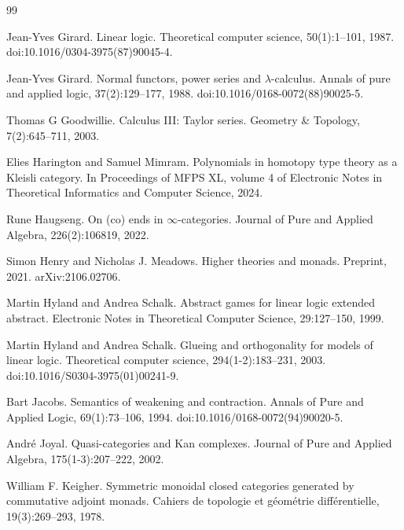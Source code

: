 \begin{thebibliography}{99}
\par\noindent    Jean-Yves Girard.  Linear logic.  Theoretical computer science, 50(1):1–101, 1987.  doi:10.1016/0304-3975(87)90045-4.  

\par\noindent    Jean-Yves Girard.  Normal functors, power series and $\lambda$-calculus.  Annals of pure and applied logic, 37(2):129–177, 1988.  doi:10.1016/0168-0072(88)90025-5.  

\par\noindent    Thomas G Goodwillie.  Calculus III: Taylor series.  Geometry \& Topology, 7(2):645–711, 2003.  

\par\noindent    Elies Harington and Samuel Mimram.  Polynomials in homotopy type theory as a Kleisli category.  In Proceedings of MFPS XL, volume 4 of Electronic Notes in Theoretical Informatics and Computer Science, 2024.  

\par\noindent    Rune Haugseng.  On (co) ends in $\infty$-categories.  Journal of Pure and Applied Algebra, 226(2):106819, 2022.  

\par\noindent    Simon Henry and Nicholas J. Meadows.  Higher theories and monads.  Preprint, 2021.  arXiv:2106.02706.  

\par\noindent    Martin Hyland and Andrea Schalk.  Abstract games for linear logic extended abstract.  Electronic Notes in Theoretical Computer Science, 29:127–150, 1999.  

\par\noindent    Martin Hyland and Andrea Schalk.  Glueing and orthogonality for models of linear logic.  Theoretical computer science, 294(1-2):183–231, 2003.  doi:10.1016/S0304-3975(01)00241-9.  

\par\noindent    Bart Jacobs.  Semantics of weakening and contraction.  Annals of Pure and Applied Logic, 69(1):73–106, 1994.  doi:10.1016/0168-0072(94)90020-5.  

\par\noindent    André Joyal.  Quasi-categories and Kan complexes.  Journal of Pure and Applied Algebra, 175(1-3):207–222, 2002.  

\par\noindent    William F. Keigher.  Symmetric monoidal closed categories generated by commutative adjoint monads.  Cahiers de topologie et géométrie différentielle, 19(3):269–293, 1978.  


\end{thebibliography}
